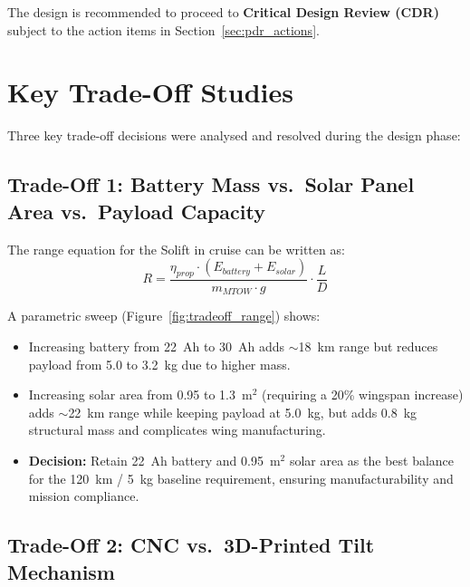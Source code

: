\noindent The design is recommended to proceed to \textbf{Critical Design Review (CDR)} subject to the action items in Section~\ref{sec:pdr_actions}.

\section{Key Trade-Off Studies}

Three key trade-off decisions were analysed and resolved during the design phase:

\subsection{Trade-Off 1: Battery Mass vs.\ Solar Panel Area vs.\ Payload Capacity}

The range equation for the Solift in cruise can be written as:
\begin{equation}
    R = \frac{\eta_{prop} \cdot (E_{battery} + E_{solar})}{m_{MTOW} \cdot g} \cdot \frac{L}{D}
    \label{eq:range}
\end{equation}

A parametric sweep (Figure~\ref{fig:tradeoff_range}) shows:
\begin{itemize}[noitemsep]
    \item Increasing battery from 22~Ah to 30~Ah adds $\sim$18~km range but reduces payload from 5.0 to 3.2~kg due to higher mass.
    \item Increasing solar area from 0.95 to 1.3~m$^2$ (requiring a 20\% wingspan increase) adds $\sim$22~km range while keeping payload at 5.0~kg, but adds 0.8~kg structural mass and complicates wing manufacturing.
    \item \textbf{Decision:} Retain 22~Ah battery and 0.95~m$^2$ solar area as the best balance for the 120~km / 5~kg baseline requirement, ensuring manufacturability and mission compliance.
\end{itemize}

\subsection{Trade-Off 2: CNC vs.\ 3D-Printed Tilt Mechanism}

